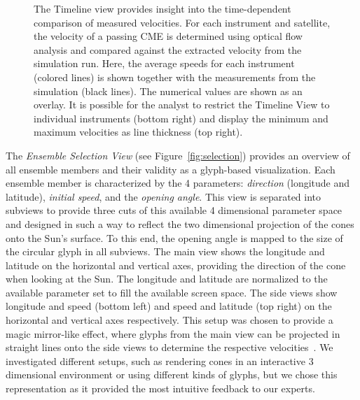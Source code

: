 \documentclass[journal]{vgtc}                %
\begin{document}
\begin{figure}
{}
\caption{The Timeline view provides insight into the time-dependent comparison of measured velocities. For each instrument and satellite, the velocity of a passing CME is determined using optical flow analysis and compared against the extracted velocity from the simulation run. Here, the average speeds for each instrument (colored lines) is shown together with the measurements from the simulation (black lines). The numerical values are shown as an overlay. It is possible for the analyst to restrict the Timeline View to individual instruments (bottom right) and display the minimum and maximum velocities as line thickness (top right).}
\label{fig:timeline}
\end{figure}

%

The \emph{Ensemble Selection View} (see Figure~\ref{fig:selection}) provides an overview of all ensemble members and their validity as a glyph-based visualization. Each ensemble member is characterized by the 4 parameters: \emph{direction} (longitude and latitude), \emph{initial speed}, and the \emph{opening angle}. This view is separated into subviews to provide three cuts of this available 4 dimensional parameter space and designed in such a way to reflect the two dimensional projection of the cones onto the Sun's surface. To this end, the opening angle is mapped to the size of the circular glyph in all subviews. The main view shows the longitude and latitude on the horizontal and vertical axes, providing the direction of the cone when looking at the Sun. The longitude and latitude are normalized to the available parameter set to fill the available screen space. The side views show longitude and speed (bottom left) and speed and latitude (top right) on the horizontal and vertical axes respectively. This setup was chosen to provide a magic mirror-like effect, where glyphs from the main view can be projected in straight lines onto the side views to determine the respective velocities~\cite{konig1999multiple}. We investigated different setups, such as rendering cones in an interactive 3 dimensional environment or using different kinds of glyphs, but we chose this representation as it provided the most intuitive feedback to our experts.
\end{document}
